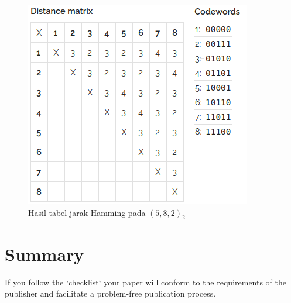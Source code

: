 \documentclass{TTP_DSL2006}
\begin{document}
\begin{figure}
\centering
\includegraphics[scale=0.7]{../img/hamming2.png}
\caption{Hasil tabel jarak Hamming pada $(5,8,2)_2$}
\label{fig:hamming2}
\end{figure}

\section{Summary}
\noindent If you follow the `checklist` your paper will conform to the requirements
 of the publisher and facilitate a problem-free publication process.


\end{document}
